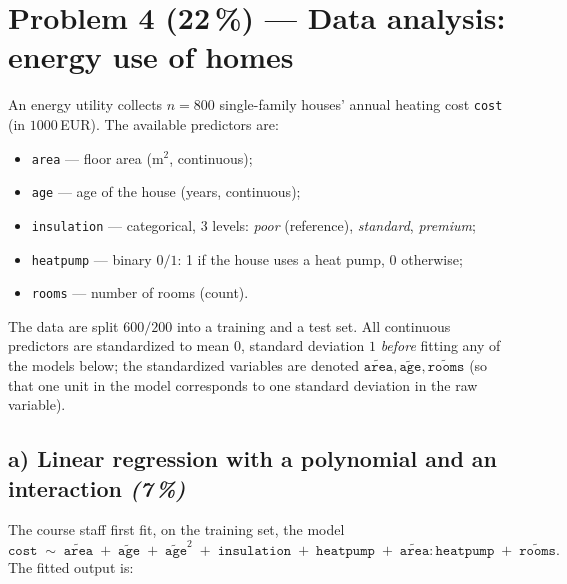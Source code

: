 \documentclass[11pt,a4paper]{article}
\newcommand{\points}[1]{\textbf{(#1\,\%)}}
\newcommand{\subpoints}[1]{\textit{(#1\,\%)}}
\begin{document}
\vfill\eject

\section*{Problem 4 \points{22} --- Data analysis: energy use of homes
}

An energy utility collects $n = 800$ single-family houses' annual heating cost \texttt{cost} (in $1000$\,EUR). The available predictors are:
\begin{itemize}
  \item \texttt{area} --- floor area (m$^2$, continuous);
  \item \texttt{age} --- age of the house (years, continuous);
  \item \texttt{insulation} --- categorical, $3$ levels: \emph{poor} (reference), \emph{standard}, \emph{premium};
  \item \texttt{heatpump} --- binary $0/1$: 1 if the house uses a heat pump, 0 otherwise;
  \item \texttt{rooms} --- number of rooms (count).
\end{itemize}

The data are split $600 / 200$ into a training and a test set. All continuous predictors are standardized to mean $0$, standard deviation $1$ \emph{before} fitting any of the models below; the standardized variables are denoted $\widetilde{\texttt{area}}, \widetilde{\texttt{age}}, \widetilde{\texttt{rooms}}$ (so that one unit in the model corresponds to one standard deviation in the raw variable).

\subsection*{a) Linear regression with a polynomial and an interaction \subpoints{7}}

The course staff first fit, on the training set, the model
$$\texttt{cost} \;\sim\; \widetilde{\texttt{area}} \;+\; \widetilde{\texttt{age}} \;+\; \widetilde{\texttt{age}}^2 \;+\; \texttt{insulation} \;+\; \texttt{heatpump} \;+\; \widetilde{\texttt{area}}\!:\!\texttt{heatpump} \;+\; \widetilde{\texttt{rooms}}.$$
The fitted output is:
\end{document}
